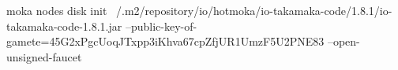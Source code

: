 \begin{shellcommandbox}\begin{ttlst}
moka nodes disk init ~/.m2/repository/io/hotmoka/io-takamaka-code/1.8.1/io-takamaka-code-1.8.1.jar --public-key-of-gamete=45G2xPgcUoqJTxpp3iKhva67cpZfjUR1UmzF5U2PNE83 --open-unsigned-faucet
\end{ttlst}\end{shellcommandbox}
